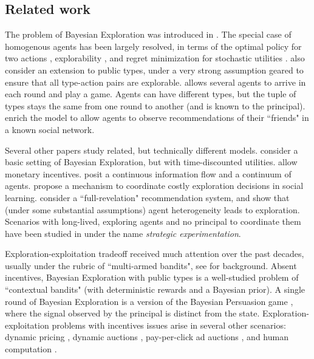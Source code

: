\subsection{Related work}
\label{sec:related}




The problem of Bayesian Exploration was introduced in \cite{Kremer-JPE14}. The special case of homogenous agents has been largely resolved, in terms of the optimal policy for two actions \cite{Kremer-JPE14}, explorability \cite{ICexplorationGames-ec16}, and regret minimization for stochastic utilities \cite{ICexploration-ec15}. \cite{ICexploration-ec15} also consider an extension to public types, under a very strong assumption geared to ensure that all type-action pairs are explorable. \cite{ICexplorationGames-ec16} allows several agents to arrive in each round and play a game. Agents can have different types, but the tuple of types stays the same from one round to another (and is known to the principal). \cite{Bahar-ec16} enrich the model to allow agents to observe recommendations of their ``friends" in a known social network.

Several other papers study related, but technically different models. \cite{Bimpikis-exploration-ms17} consider a basic setting of Bayesian Exploration, but with time-discounted utilities. \cite{Frazier-ec14} allow monetary incentives. \cite{Che-13} posit a continuous information flow and a continuum of agents. \cite{Bobby-Glen-ec16} propose a mechanism to coordinate costly exploration decisions in social learning. \cite{Sven-aistats18} consider a ``full-revelation" recommendation system, and show that (under some substantial assumptions) agent heterogeneity leads to exploration. Scenarios with long-lived, exploring agents and no principal to coordinate them have been studied in \cite{Bolton-econometrica99,Keller-econometrica05} under the name \emph{strategic experimentation}.

Exploration-exploitation tradeoff received much attention over the past decades, usually under the rubric of ``multi-armed bandits", see  \cite{Bubeck-survey12,Gittins-book11} for background. Absent incentives, Bayesian Exploration with public types is a well-studied problem of ``contextual bandits" (with deterministic rewards and a Bayesian prior). A single round of Bayesian Exploration is a version of the Bayesian Persuasion game \cite{Kamenica-aer11}, where the signal observed by the principal is distinct from the state. Exploration-exploitation problems with incentives issues arise in several other scenarios: dynamic pricing
    \cite{KleinbergL03,BZ09,BwK-focs13},
dynamic auctions
    \cite{AtheySegal-econometrica13,DynPivot-econometrica10,Kakade-pivot-or13},
pay-per-click ad auctions
    \cite{MechMAB-ec09,DevanurK09,Transform-ec10-jacm},
and human computation
    \cite{RepeatedPA-ec14,Ghosh-itcs13,Krause-www13}.


